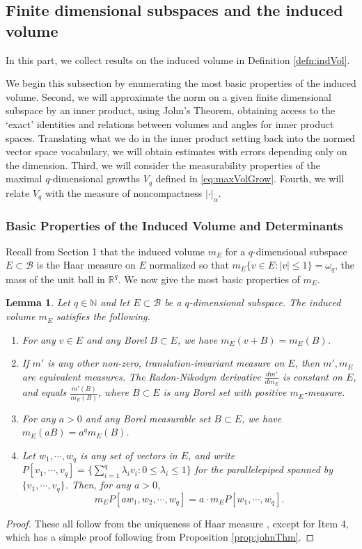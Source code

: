 \documentclass[11pt]{amsart}
\theoremstyle{theorem}
\newtheorem{lem}[thm]{Lemma}
\theoremstyle{definition}
\numberwithin{equation}{section}
\newcommand{\N}{\mathbb{N}}
\newcommand{\R}{\mathbb{R}}
\renewcommand{\a}{\alpha}
\renewcommand{\l}{\lambda}
\newcommand{\Bc}{\mathcal{B}}
\begin{document}
\subsection{Finite dimensional subspaces and the induced volume}

In this part, we collect results on the induced volume in Definition \ref{defn:indVol}. 

We begin this subsection by enumerating the most basic properties of the induced volume. Second, we will approximate the norm on a given finite dimensional subspace by an inner product, using John's Theorem, obtaining access to the `exact' identities and relations between volumes and angles for inner product spaces. Translating what we do in the inner product setting back into the normed vector space vocabulary, we will obtain estimates with errors depending only on the dimension. Third, we will consider the measurability properties of the maximal $q$-dimensional growths $V_q$ defined in \eqref{eq:maxVolGrow}. Fourth, we will relate $V_q$ with the measure of noncompactness $|\cdot|_{\a}$.

\subsubsection{Basic Properties of the Induced Volume and Determinants}

Recall from Section 1 that the induced volume $m_E$ for a $q$-dimensional subspace $E \subset \Bc$ is the Haar measure on $E$ normalized so that $m_E \{v \in E : |v| \leq 1\} = \omega_q$, the mass of the unit ball in $\R^q$. We now give the most basic properties of $m_E$. 

\begin{lem}\label{lem:indVol}
Let $q \in \N$ and let $E \subset \Bc$ be a $q$-dimensional subspace. The induced volume $m_E$ satisfies the following.
\begin{enumerate}
\item For any $v \in E$ and any Borel $B \subset E$, we have $m_E(v + B) = m_E (B)$.
\item If $m'$ is any other non-zero, translation-invariant measure on $E$, then $m', m_E$ are equivalent measures. The Radon-Nikodym derivative $\frac{d m'}{dm_E}$ is constant on $E$, and equals $\frac{m'(B)}{m_E(B)}$, where $B \subset E$ is any Borel set with positive $m_E$-measure.
\item For any $a > 0$ and any Borel measurable set $B \subset E$, we have $m_E (a B) = a^q m_E(B)$.
\item Let $w_1, \cdots, w_q$ is any set of vectors in $E$, and write $P[v_1,\cdots,v_q] = \{\sum_{i = 1}^q \l_i v_i : 0 \leq \l_i \leq 1\}$ for the parallelepiped spanned by $\{v_1, \cdots, v_q\}$. Then, for any $a > 0$,
\[
m_E P[a w_1, w_2, \cdots, w_q] = a \cdot m_E P[w_1, \cdots, w_q].
\]

\end{enumerate}
\end{lem}
\begin{proof}
These all follow from the uniqueness of Haar measure \cite{F}, except for Item 4, which has a simple proof following from Proposition \ref{prop:johnThm}.
\end{proof}
\end{document}
